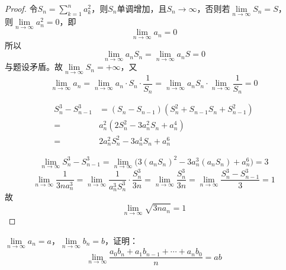 \begin{proof}

    令$S_n = \sum\limits_{k  = 1}^{n}{a_k^2}$，则$S_n$单调增加，且$S_n \to \infty$，否则若$\lim\limits_{n \to \infty}{S_n} = S$，\\
    则$\lim\limits_{n \to \infty}{a_n^2} = 0$，即
    $$\lim\limits_{n \to \infty}{a_n} = 0$$
    所以
    $$\lim\limits_{n \to \infty}{a_nS_n} = \lim\limits_{n \to \infty}{a_nS} = 0$$
    与题设矛盾。故$\lim\limits_{n \to \infty}{S_n} = +\infty$，又
    $$\lim\limits_{n \to \infty}{a_n} = \lim\limits_{n \to \infty}{a_n \cdot S_n \cdot \dfrac{1}{S_n}} = \lim\limits_{n \to \infty}{a_nS_n} \cdot \lim\limits_{n \to \infty}{\dfrac{1}{S_n}} = 0$$

    \begin{align*}
        S_n^3 - S_{n - 1}^3 & = (S_n - S_{n - 1}) (S_n^2 + S_{n - 1}S_n + S_{n - 1}^2) \\
        = & a_n^2 (2S_n^2 - 3a_n^2S_n + a_n^4) \\
        = & 2a_n^2S_n^2 - 3a_n^4S_n + a_n^6 
    \end{align*}
    
    $$\lim\limits_{n \to \infty}{S_n^3 - S_{n - 1}^3} =  \lim\limits_{n \to \infty}{\big( 3(a_nS_n)^2 - 3a_n^3(a_nS_n) + a_n^6 \big)} = 3$$
    $$\lim\limits_{n \to \infty}{\dfrac{1}{3na_n^3}} = \lim\limits_{n \to \infty}{\dfrac{1}{a_n^3S_n^3} \cdot \dfrac{S_n^3}{3n}} = \lim\limits_{n \to \infty}{\dfrac{S_n^3}{3n}} = \lim\limits_{n \to \infty}{\dfrac{S_n^3 - S_{n - 1}^3}{3}} = 1$$
    故
    $$\lim\limits_{n \to \infty}{\sqrt{3na_n}} = 1$$

\end{proof}

\begin{proposition}

    $\lim\limits_{n \to \infty}{a_n} = a $，$\lim\limits_{n \to \infty}{b_n} = b $，证明：
    $$\lim\limits_{n \to \infty}{\dfrac{a_0b_n + a_1b_{n - 1} + \cdots + a_nb_0}{n}} = ab$$

\end{proposition}

